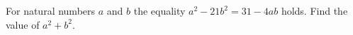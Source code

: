For natural numbers $a$ and $b$ the equality $a^{2}-21b^{2}=31-4ab$ holds. Find the value of $a^{2}+b^{2}$.
